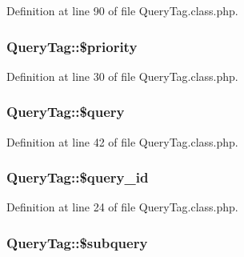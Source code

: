 Definition at line 90 of file Query\+Tag.\+class.\+php.

\subsubsection[{\texorpdfstring{\$priority}{$priority}}]{\setlength{\rightskip}{0pt plus 5cm}Query\+Tag\+::\$priority}\hypertarget{classQueryTag_ac09e6c0124ba1d5945c7f93232e13827}{}\label{classQueryTag_ac09e6c0124ba1d5945c7f93232e13827}


Definition at line 30 of file Query\+Tag.\+class.\+php.

\subsubsection[{\texorpdfstring{\$query}{$query}}]{\setlength{\rightskip}{0pt plus 5cm}Query\+Tag\+::\$query}\hypertarget{classQueryTag_a40fbf27ebaa31f5430080152164c3bae}{}\label{classQueryTag_a40fbf27ebaa31f5430080152164c3bae}


Definition at line 42 of file Query\+Tag.\+class.\+php.

\subsubsection[{\texorpdfstring{\$query\+\_\+id}{$query_id}}]{\setlength{\rightskip}{0pt plus 5cm}Query\+Tag\+::\$query\+\_\+id}\hypertarget{classQueryTag_ac9ddaab237f51a26128e5f4d2869a430}{}\label{classQueryTag_ac9ddaab237f51a26128e5f4d2869a430}


Definition at line 24 of file Query\+Tag.\+class.\+php.

\subsubsection[{\texorpdfstring{\$subquery}{$subquery}}]{\setlength{\rightskip}{0pt plus 5cm}Query\+Tag\+::\$subquery}\hypertarget{classQueryTag_a1fb40050f2484c2daa9e77cf53d11c15}{}\label{classQueryTag_a1fb40050f2484c2daa9e77cf53d11c15}


